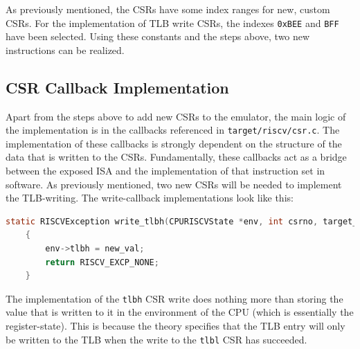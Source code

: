 As previously mentioned, the CSRs have some index ranges for new, custom CSRs. For the implementation
of TLB write CSRs, the indexes \texttt{0xBEE} and \texttt{BFF} have been selected.
Using these constants and the steps above, two new instructions can be realized.

\subsection{CSR Callback Implementation} Apart from the steps above to add new CSRs to the emulator, the
main logic of the implementation is in the callbacks referenced in \texttt{target/riscv/csr.c}.
The implementation of these callbacks is strongly dependent on the structure of the data that is written to
the CSRs. Fundamentally, these callbacks act as a bridge between the exposed ISA and the implementation of
that instruction set in software.
As previously mentioned, two new CSRs will be needed to implement the TLB-writing. 
The write-callback implementations look like this:



\begin{lstlisting}[language=c,float=h!,
    label={lst:tlbh}]
    static RISCVException write_tlbh(CPURISCVState *env, int csrno, target_ulong new_val)
    {
        env->tlbh = new_val;
        return RISCV_EXCP_NONE;
    }
\end{lstlisting}
The implementation of the \texttt{tlbh} CSR write does nothing more than storing the value
that is written to it in the environment of the CPU (which is essentially the register-state).
This is because the theory specifies that the TLB entry will only
be written to the TLB when the write to the \texttt{tlbl} CSR has succeeded.

